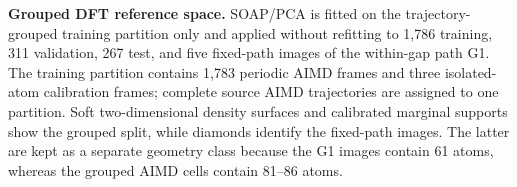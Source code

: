 \caption{\textbf{Grouped DFT reference space.} SOAP/PCA is fitted on the trajectory-grouped training partition only and applied without refitting to 1,786 training, 311 validation, 267 test, and five fixed-path images of the within-gap path G1. The training partition contains 1,783 periodic AIMD frames and three isolated-atom calibration frames; complete source AIMD trajectories are assigned to one partition. Soft two-dimensional density surfaces and calibrated marginal supports show the grouped split, while diamonds identify the fixed-path images. The latter are kept as a separate geometry class because the G1 images contain 61 atoms, whereas the grouped AIMD cells contain 81--86 atoms.}
\label{fig:task_conditioned_panel_a}
